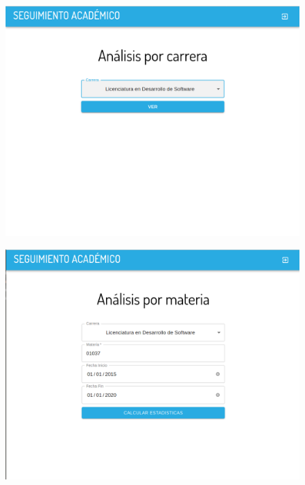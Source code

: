 \begin{figure}[!htbp]
  \centering
    \includegraphics[scale=0.3]{images/seguimiento-academico/sa-form-carrera.png}
  \label{fig:sa-carrera}
\end{figure}

\begin{figure}[!htbp]
  \centering
    \includegraphics[scale=0.3]{images/seguimiento-academico/sa-form-materia.png}
  \label{fig:sa-materia}
\end{figure}

